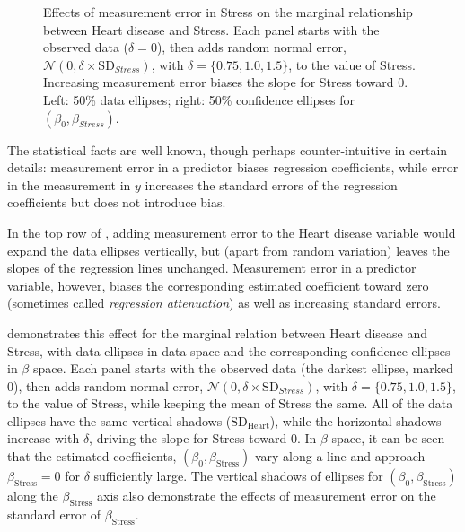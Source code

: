 \begin{figure}[htb]
\begin{minipage}[b]{.49\linewidth}
 \end{minipage}
  \caption{Effects of measurement error in Stress on the marginal relationship between Heart disease and Stress.
  Each panel starts with the observed data ($\delta=0$), then adds random normal error,
  $\mathcal{N}(0, \delta \times \mathrm{SD}_{Stress})$, with $\delta = \{0.75, 1.0, 1.5\}$, to the value of Stress.
  Increasing measurement error biases the slope for Stress toward 0.
  Left: 50\% data ellipses; right: 50\% confidence ellipses for $(\beta_0, \beta_{Stress})$. }
  \label{fig:coffee-stress}
\end{figure}

The statistical facts are well known, though perhaps counter-intuitive in certain details:
measurement error in a predictor biases regression coefficients, while
error in the measurement in  $y$
increases the standard errors of the regression coefficients but does not introduce
bias.


In the top row of
, adding measurement error to the Heart disease variable
would expand the data ellipses vertically, but 
(apart from random variation)
leaves the slopes of the regression lines unchanged.
Measurement error in a predictor variable, however, biases the corresponding
estimated coefficient toward
zero (sometimes called \emph{regression attenuation}) as well as increasing standard errors.
                                         
 demonstrates this effect for the marginal
relation between Heart disease and Stress,
with data ellipses in data space and the corresponding confidence ellipses in $\beta$ space.
Each panel starts with the observed data (the darkest ellipse, marked $0$), then adds random normal error,
$\mathcal{N}(0, \delta \times \mathrm{SD}_{Stress})$, with $\delta = \{0.75, 1.0, 1.5\}$, to the value of Stress,
while keeping the mean of Stress the same.
All of the data ellipses have the same vertical shadows ($\mathrm{SD}_{\textrm{Heart}}$), while the horizontal shadows
increase with $\delta$, driving the slope for Stress toward 0.
In $\beta$ space, it can be seen that the estimated coefficients, $(\beta_0, \beta_{\textrm{Stress}})$
vary along a line and approach $\beta_{\textrm{Stress}}=0$ for $\delta$ sufficiently large.
The vertical shadows of
ellipses for $(\beta_0, \beta_{\textrm{Stress}})$ along the $\beta_{\textrm{Stress}}$ axis
also demonstrate the effects of measurement error
on the standard error of $\beta_{\textrm{Stress}}$.

